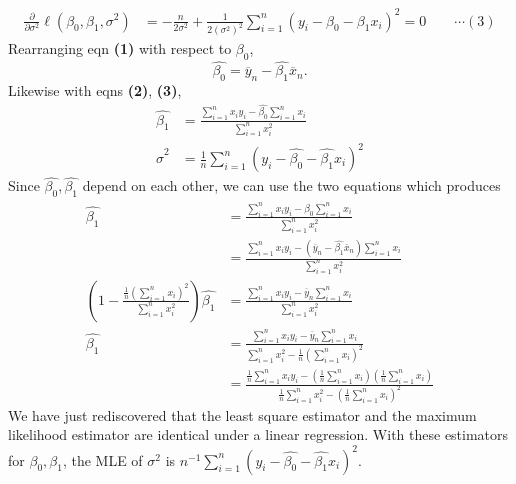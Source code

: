 \documentclass[answers]{exam}
\begin{document}
\begin{questions}
\begin{solution}
\begin{align*}
         \frac{\partial}{\partial \sigma^{2}}\ell\left(\beta_{0},\beta_{1},\sigma^{2}\right) &= -\frac{n}{2\sigma^{2}} + \frac{1}{2\left(\sigma^{2}\right)^{2}}\sum_{i=1}^{n}\left(y_{i}-\beta_{0}-\beta_{1}x_{i}\right)^{2} =0 \qquad \cdots (3)
      \end{align*}
      Rearranging eqn \textbf{(1)} with respect to $\beta_{0}$,
      $$
         \hat{\beta_{0}} = \overline{y}_{n} - \hat{\beta_{1}}\overline{x}_{n}.
      $$
      Likewise with eqns \textbf{(2)}, \textbf{(3)},
      \begin{align*}
         \hat{\beta_{1}} &= \frac{\sum_{i=1}^{n}x_{i}y_{i}-\hat{\beta_{0}}\sum_{i=1}^{n}x_{i}}{\sum_{i=1}^{n}x_{i}^{2}}\\
         \widehat{\sigma}^{2} &= \frac{1}{n}\sum_{i=1}^{n}\left(y_{i}-\hat{\beta_{0}}-\hat{\beta_{1}}x_{i}\right)^{2}
      \end{align*}
      Since $\hat{\beta_{0}}, \hat{\beta_{1}}$ depend on each other, we can use the two equations which produces
      \begin{align*}
         \hat{\beta_{1}} &= \frac{\sum_{i=1}^{n}x_{i}y_{i} - \hat{\beta_{0}}\sum_{i=1}^{n}x_{i}}{\sum_{i=1}^{n}x_{i}^{2}}\\
         &= \frac{\sum_{i=1}^{n}x_{i}y_{i} - \left(\overline{y}_{n}-\hat{\beta_{1}}\overline{x}_{n} \right)\sum_{i=1}^{n}x_{i}}{\sum_{i=1}^{n}x_{i}^{2}}\\
         \left(1-\frac{\frac{1}{n}\left(\sum_{i=1}^{n}x_{i}\right)^{2}}{\sum_{i=1}^{n}x_{i}^{2}} \right)\hat{\beta_{1}} &= \frac{\sum_{i=1}^{n}x_{i}y_{i} - \overline{y}_{n}\sum_{i=1}^{n}x_{i}}{\sum_{i=1}^{n}x_{i}^{2}}\\
         \hat{\beta_{1}} &= \frac{\sum_{i=1}^{n}x_{i}y_{i} - \overline{y}_{n}\sum_{i=1}^{n}x_{i}}{\sum_{i=1}^{n}x_{i}^{2}-\frac{1}{n}\left(\sum_{i=1}^{n}x_{i}\right)^{2}}\\
         &= \frac{\frac{1}{n}\sum_{i=1}^{n}x_{i}y_{i} - \left(\frac{1}{n}\sum_{i=1}^{n}x_{i}\right)\left(\frac{1}{n}\sum_{i=1}^{n}x_{i}\right)}{\frac{1}{n}\sum_{i=1}^{n}x_{i}^{2}-\left(\frac{1}{n}\sum_{i=1}^{n}x_{i}\right)^{2}}
      \end{align*}
      We have just rediscovered that the least square estimator and the maximum likelihood estimator are identical under a linear regression. With these estimators for $\beta_{0}, \beta_{1}$, the MLE of $\sigma^{2}$ is $n^{-1}\sum_{i=1}^{n}\left(y_{i}-\hat{\beta_{0}}-\hat{\beta_{1}}x_{i}\right)^{2}$.
   \end{solution}
   \begin{solution}

\end{solution}
\end{questions}
\end{document}
